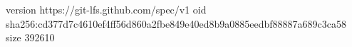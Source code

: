 version https://git-lfs.github.com/spec/v1
oid sha256:cd377d7c4610ef4ff56d860a2fbe849e40ed8b9a0885eedbf88887a689c3ca58
size 392610
